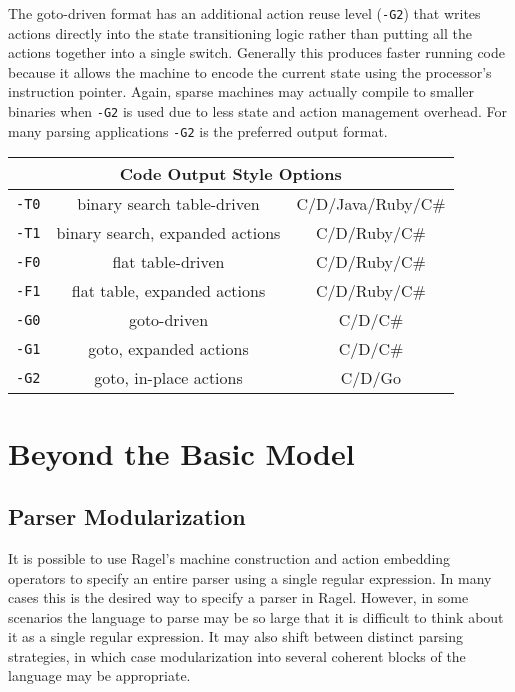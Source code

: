 \documentclass[letterpaper,11pt,oneside]{book}
\newcommand{\verbspace}{\vspace{10pt}}
\begin{document}
The goto-driven format has an additional action reuse level (\verb|-G2|) that
writes actions directly into the state transitioning logic rather than putting
all the actions together into a single switch. Generally this produces faster
running code because it allows the machine to encode the current state using
the processor's instruction pointer. Again, sparse machines may actually
compile to smaller binaries when \verb|-G2| is used due to less state and
action management overhead. For many parsing applications \verb|-G2| is the
preferred output format.

\verbspace
\begin{center}
\begin{tabular}{|c|c|c|}
\hline
\multicolumn{3}{|c|}{\bf Code Output Style Options} \\
\hline
\verb|-T0|&binary search table-driven&C/D/Java/Ruby/C\#\\
\hline
\verb|-T1|&binary search, expanded actions&C/D/Ruby/C\#\\
\hline
\verb|-F0|&flat table-driven&C/D/Ruby/C\#\\
\hline
\verb|-F1|&flat table, expanded actions&C/D/Ruby/C\#\\
\hline
\verb|-G0|&goto-driven&C/D/C\#\\
\hline
\verb|-G1|&goto, expanded actions&C/D/C\#\\
\hline
\verb|-G2|&goto, in-place actions&C/D/Go\\
\hline
\end{tabular}
\end{center}

\chapter{Beyond the Basic Model}

\section{Parser Modularization}
\label{modularization}

It is possible to use Ragel's machine construction and action embedding
operators to specify an entire parser using a single regular expression. In
many cases this is the desired way to specify a parser in Ragel. However, in
some scenarios the language to parse may be so large that it is difficult to
think about it as a single regular expression. It may also shift between distinct
parsing strategies, in which case modularization into several coherent blocks
of the language may be appropriate.
\end{document}

